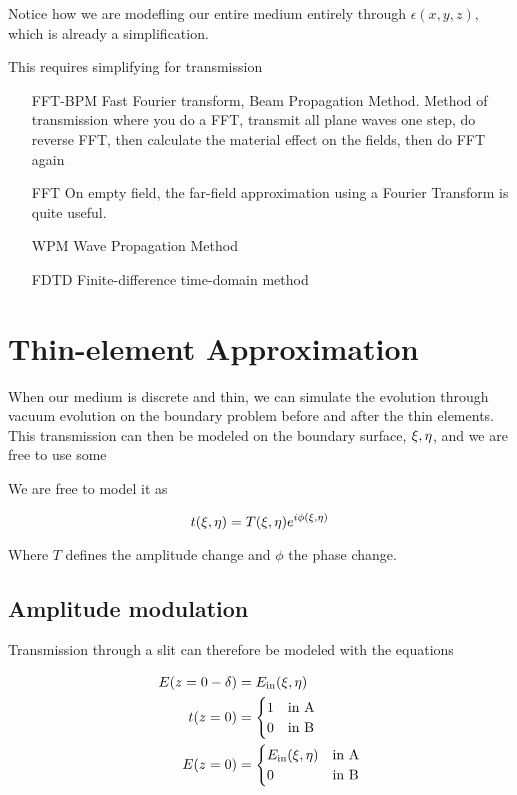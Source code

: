 \documentclass[../main/main.tex]{subfiles}
\begin{document}
Notice how we are modefling our entire medium entirely through $\epsilon(x,y,z)$, which is already a simplification.

This requires simplifying for transmission

\begin{enumerate}
	\item [FFT-BPM] Fast Fourier transform, Beam Propagation Method. Method of transmission where you do a FFT, transmit all plane waves one step, do reverse FFT,  then calculate the material effect on the fields, then do FFT again  %
	\item[FFT] On empty field, the far-field approximation using a Fourier Transform is quite useful.
	\item[WPM] Wave Propagation Method
	\item[FDTD] Finite-difference time-domain method
\end{enumerate}


\section{Thin-element Approximation}

When our medium is discrete and thin, we can simulate the evolution through vacuum evolution on the boundary problem before and after the thin elements. This transmission can then be modeled on the boundary surface, $\xi, \eta$, and we are free to use some

\begin{equations}
We are free to model it as

\begin{equation}
t(\xi, \eta) = T(\xi, \eta) e ^{i \phi (\xi, \eta)}
\end{equation}

Where $T$ defines the amplitude change and $\phi$ the phase change.

\end{equations}


\subsection{Amplitude modulation}

Transmission through a slit can therefore be modeled with the equations

\begin{align*}
E(z=0-\delta) &= E_{\textrm{in}}(\xi, \eta) \\
t(z=0) &= \begin{cases}
1 &\textrm{in A}\\
0 &\textrm{in B}
\end{cases}\\
E(z=0) &= \begin{cases}
E_{\textrm{in}}(\xi, \eta) &\textrm{in A}\\
0 &\textrm{in B}
\end{cases}
\end{align*}
\end{document}
